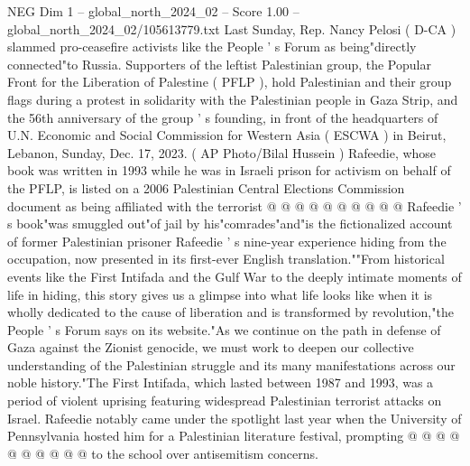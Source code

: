 \begin{textsample}{NEG Dim 1 – global\_north\_2024\_02 – Score 1.00 – global\_north\_2024\_02/105613779.txt}
Last Sunday, Rep.
Nancy Pelosi ( D-CA ) slammed pro-ceasefire activists like the People ' s Forum as being"directly connected"to Russia.
Supporters of the leftist Palestinian group, the Popular Front for the Liberation of Palestine ( PFLP ), hold Palestinian and their group flags during a protest in solidarity with the Palestinian people in Gaza Strip, and the 56th anniversary of the group ' s founding, in front of the headquarters of U.N.
Economic and Social Commission for Western Asia ( ESCWA ) in Beirut, Lebanon, Sunday, Dec. 17, 2023. ( AP Photo/Bilal Hussein ) Rafeedie, whose book was written in 1993 while he was in Israeli prison for activism on behalf of the PFLP, is listed on a 2006 Palestinian Central Elections Commission document as being affiliated with the terrorist @ @ @ @ @ @ @ @ @ @ Rafeedie ' s book"was smuggled out"of jail by his"comrades"and"is the fictionalized account of former Palestinian prisoner Rafeedie ' s nine-year experience hiding from the occupation, now presented in its first-ever English translation.""From historical events like the First Intifada and the Gulf War to the deeply intimate moments of life in hiding, this story gives us a glimpse into what life looks like when it is wholly dedicated to the cause of liberation and is transformed by revolution,"the People ' s Forum says on its website."As we continue on the path in defense of Gaza against the Zionist genocide, we must work to deepen our collective understanding of the Palestinian struggle and its many manifestations across our noble history."The First Intifada, which lasted between 1987 and 1993, was a period of violent uprising featuring widespread Palestinian terrorist attacks on Israel.
Rafeedie notably came under the spotlight last year when the University of Pennsylvania hosted him for a Palestinian literature festival, prompting @ @ @ @ @ @ @ @ @ @ to the school over antisemitism concerns.

\end{textsample}
